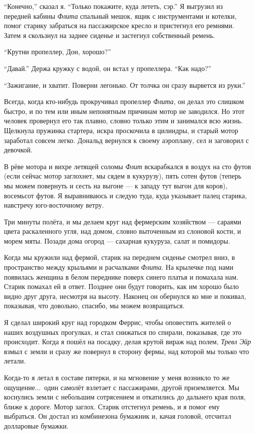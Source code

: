 ``Конечно,'' сказал я. ``Только покажите, куда лететь, сэр.''
Я выгрузил из передней кабины {\it Флита\/} спальный мешок, ящик с инструментами и котелки, помог старику забраться на пассажирское кресло и пристегнул его ремнями. Затем я скользнул на заднее сиденье и застегнул собственный ремень.

``Крутни пропеллер, Дон, хорошо?''

``Давай.'' Держа кружку с водой, он встал у пропеллера. ``Как надо?''

``Зажигание, и хватит. Поверни легонько. От толчка он сразу вырвется из руки.''

Всегда, когда кто-нибудь прокручивал пропеллер {\it Флита}, он делал это слишком быстро, и по тем или иным непонятным причинам мотор не заводился. Но этот человек провернул его так плавно, словно только этим и занимался всю жизнь. Щелкнула пружинка стартера, искра проскочила в цилиндры, и старый мотор заработал совсем легко. Дональд вернулся к своему аэроплану, сел и заговорил с девочкой.

В рёве мотора и вихре летящей соломы {\it Флит\/} вскарабкался в воздух на сто футов (если сейчас мотор заглохнет, мы сядем в кукурузу), пять сотен футов (теперь мы можем повернуть и сесть на выгоне --- к западу тут выгон для коров), восемьсот футов. Я выравниваюсь и следую туда, куда указывает палец старика, навстречу юго-восточному ветру.

Три минуты полёта, и мы делаем круг над фермерским хозяйством --- сараями цвета раскаленного угля, над домом, словно выточенным из слоновой кости, и морем мяты. Позади дома огород --- сахарная кукуруза, салат и помидоры.

Когда мы кружили над фермой, старик на переднем сиденье смотрел вниз, в пространство между
крыльями и расчалками {\it Флита}. На крылечке под нами появилась женщина в белом переднике поверх
синего платья и помахала нам. Старик помахал ей в ответ. Позднее они будут говорить, как им хорошо
было видно друг друга, несмотря на высоту. Наконец он обернулся ко мне и покивал, показывая, что
довольно, спасибо, мы можем возвращаться.

Я сделал широкий круг над городком Феррис, чтобы оповестить жителей о наших воздушных прогулках,
и стал снижаться по спирали, показывая, где это происходит. Когда я пошёл на посадку, делая крутой
вираж над полем, {\it Тревл Эйр\/} взмыл с земли и сразу же повернул в сторону фермы, над которой мы только что летали.

Когда-то я летал в составе пятерки, и на мгновение у меня возникло то же ощущение...\ один самолёт взлетает с пассажирами, другой приземляется. Мы коснулись земли с небольшим сотрясением и откатились до дальнего края поля, ближе к дороге. Мотор заглох. Старик отстегнул ремень, и я помог ему выбраться. Он достал из комбинезона бумажник и, качая головой, отсчитал долларовые бумажки.

